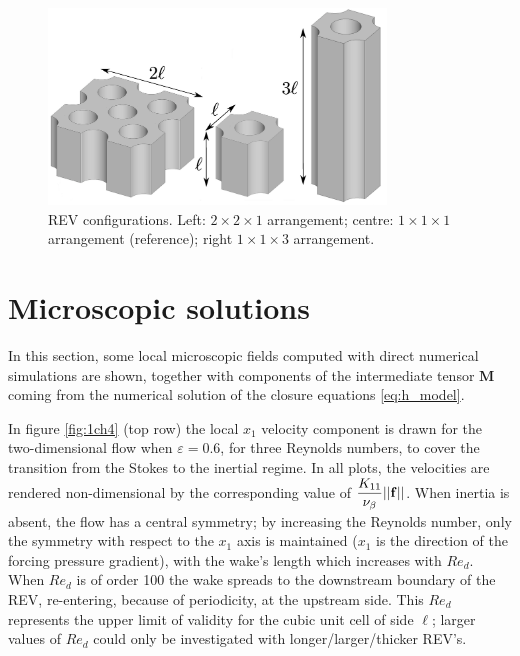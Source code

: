 \begin{figure}[h!]
	\centering
	\includegraphics[width=0.8\textwidth]{chapter_4/figure/multiple}
	\caption{REV configurations. Left: $2 \times 2 \times 1$ arrangement; centre: $1 \times 1 \times 1$ arrangement (reference);  right $1 \times 1 \times 3$ arrangement.}
	\label{fig:multiple}
\end{figure}



\section{Microscopic solutions}

In this section, some local microscopic fields computed with direct numerical simulations are shown, together with components of the intermediate tensor $\mathbf{M}$ coming from the numerical solution of the closure equations \eqref{eq:h_model}. 

In figure \ref{fig:1ch4} (top row) the local $x_1$ velocity component is drawn for the two-dimensional flow when $\varepsilon=0.6$, for three 
Reynolds numbers, to cover the transition from the Stokes to the inertial regime. In all plots, the velocities are rendered non-dimensional by
the corresponding value of 
$\displaystyle{\frac{K_{11}}{\nu_{\beta}} ||\bf{f}||}$. When inertia is absent, the flow has a central symmetry; by increasing the Reynolds number, only the 
symmetry with respect to the $x_1$ axis is maintained ($x_1$ is the direction of the forcing pressure gradient), with the wake's length which 
increases with $Re_d$. When $Re_d$ is of order 100 the wake spreads to the downstream boundary of the REV, re-entering, because of periodicity, 
at the upstream side.	This $Re_d$  represents the upper limit of validity for the cubic unit cell of side $\ell$; larger values of $Re_d$ 
could only be investigated with longer/larger/thicker REV's.

